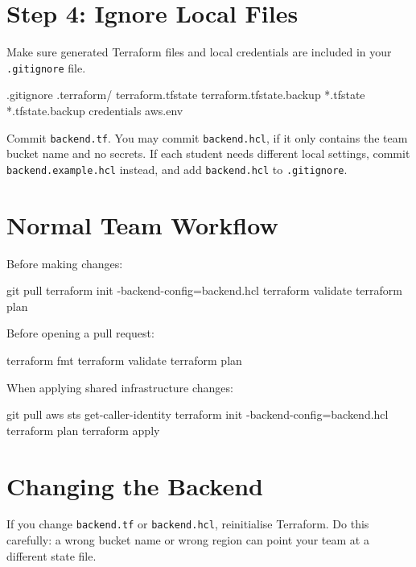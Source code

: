 \documentclass{csse4400}
\begin{document}


\section{Step 4: Ignore Local Files}

Make sure generated Terraform files and local credentials are included in your \texttt{.gitignore} file.
%
\begin{code}[numbers=none]{.gitignore}
.terraform/
terraform.tfstate
terraform.tfstate.backup
*.tfstate
*.tfstate.backup
credentials
aws.env
\end{code}

\noindent
Commit \texttt{backend.tf}.
You may commit \texttt{backend.hcl}, if it only contains the team bucket name and no secrets.
If each student needs different local settings, commit \texttt{backend.example.hcl} instead,
and add \texttt{backend.hcl} to \texttt{.gitignore}.


\section{Normal Team Workflow}

Before making changes:

\begin{code}[language=shell,numbers=none]{}
git pull
terraform init -backend-config=backend.hcl
terraform validate
terraform plan
\end{code}

\noindent
Before opening a pull request:

\begin{code}[language=shell,numbers=none]{}
terraform fmt
terraform validate
terraform plan
\end{code}

\noindent
When applying shared infrastructure changes:

\begin{code}[language=shell,numbers=none]{}
git pull
aws sts get-caller-identity
terraform init -backend-config=backend.hcl
terraform plan
terraform apply
\end{code}



\section{Changing the Backend}

If you change \texttt{backend.tf} or \texttt{backend.hcl},
reinitialise Terraform.
Do this carefully:
a wrong bucket name or wrong region can point your team at a different state file.


\end{document}
